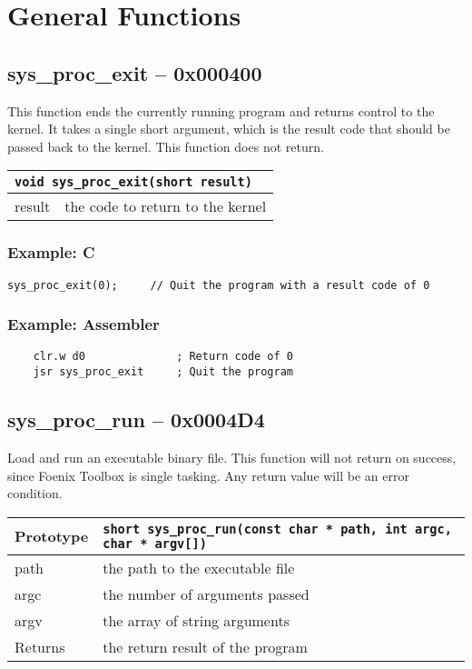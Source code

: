 \section{General Functions}

\subsection*{sys\_proc\_exit -- 0x000400}
This function ends the currently running program and returns control to the kernel. It takes a single short argument,
which is the result code that should be passed back to the kernel. This function does not return.

\bigskip

\begin{tabular}{|l|l|} \hline
\multicolumn{2}{|l|}{\lstinline!void sys_proc_exit(short result)!} \\ \hline\hline
result    & the code to return to the kernel \\ \hline
\end{tabular}

\subsubsection*{Example: C}
\begin{lstlisting}
sys_proc_exit(0);     // Quit the program with a result code of 0
\end{lstlisting}

\subsubsection*{Example: Assembler}
\begin{verbatim}
    clr.w d0              ; Return code of 0
    jsr sys_proc_exit     ; Quit the program
\end{verbatim}

\subsection*{sys\_proc\_run -- 0x0004D4}
Load and run an executable binary file.
This function will not return on success, since Foenix Toolbox is single tasking.
Any return value will be an error condition.

\bigskip

\begin{tabular}{|l||l|} \hline
Prototype & \lstinline!short sys_proc_run(const char * path, int argc, char * argv[])! \\ \hline
path & the path to the executable file \\ \hline
argc & the number of arguments passed \\ \hline
argv & the array of string arguments \\ \hline
Returns & the return result of the program \\ \hline
\end{tabular}

